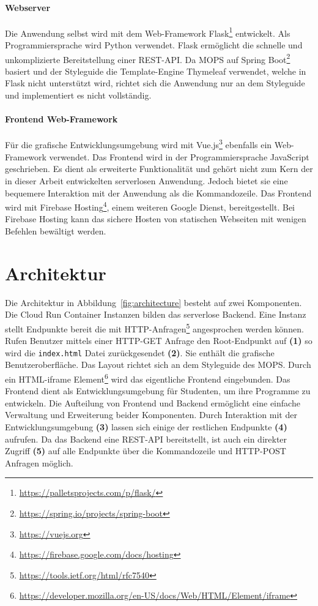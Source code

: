 \paragraph{Webserver} Die Anwendung selbst wird mit dem Web-Framework
Flask\footnote{\url{https://palletsprojects.com/p/flask/}}
entwickelt. Als Programmiersprache wird Python verwendet.
Flask ermöglicht die schnelle und unkomplizierte Bereitstellung einer REST-API.
Da MOPS auf Spring Boot\footnote{\url{https://spring.io/projects/spring-boot}} basiert und
der Styleguide die Template-Engine Thymeleaf verwendet, welche in Flask nicht unterstützt wird,
richtet sich die Anwendung nur an dem Styleguide und implementiert es nicht vollständig.

\paragraph{Frontend Web-Framework} Für die grafische Entwicklungsumgebung
wird mit Vue.js\footnote{\url{https://vuejs.org}} ebenfalls ein Web-Framework verwendet.
Das Frontend wird in der Programmiersprache JavaScript geschrieben. Es dient als
erweiterte Funktionalität und gehört nicht zum Kern der in dieser Arbeit entwickelten
serverlosen Anwendung. Jedoch bietet sie eine bequemere Interaktion mit der Anwendung als
die Kommandozeile. Das Frontend wird mit
Firebase Hosting\footnote{\url{https://firebase.google.com/docs/hosting}}, einem weiteren Google Dienst,
bereitgestellt. Bei Firebase Hosting kann das sichere Hosten von statischen Webseiten
mit wenigen Befehlen bewältigt werden.

\section{Architektur}
Die Architektur in Abbildung~\ref{fig:architecture} besteht auf zwei
Komponenten.
Die Cloud Run Container Instanzen bilden das serverlose Backend.
Eine Instanz stellt Endpunkte bereit die mit HTTP-Anfragen\footnote{\url{https://tools.ietf.org/html/rfc7540}}
angesprochen werden
können. Rufen Benutzer mittels einer HTTP-GET Anfrage den
Root-Endpunkt auf \textbf{(1)} so wird
die \texttt{index.html} Datei zurückgesendet \textbf{(2)}.
Sie enthält die grafische Benutzeroberfläche. Das Layout richtet
sich an dem Styleguide des MOPS. Durch ein
HTML-iframe Element\footnote{\url{https://developer.mozilla.org/en-US/docs/Web/HTML/Element/iframe}}
wird das eigentliche Frontend eingebunden. Das Frontend dient als Entwicklungsumgebung für
Studenten, um ihre Programme zu entwickeln. Die Aufteilung von Frontend und Backend
ermöglicht eine einfache Verwaltung und Erweiterung beider Komponenten.
Durch Interaktion mit der Entwicklungsumgebung \textbf{(3)} lassen sich einige
der restlichen Endpunkte \textbf{(4)} aufrufen. 
Da das Backend eine REST-API bereitstellt, ist auch ein direkter Zugriff \textbf{(5)} auf alle 
Endpunkte über die Kommandozeile und HTTP-POST Anfragen möglich.

